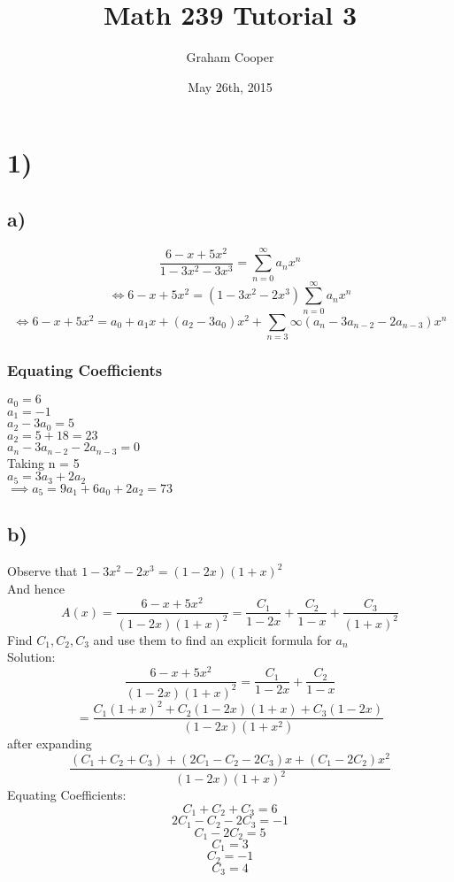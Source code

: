 \documentclass[12pt]{article}
\title{\vspace{-15ex}Math 239 Tutorial 3\vspace{-1ex}}
\date{May 26th, 2015}
\author{Graham Cooper}
\begin{document}
	\maketitle
	
	\section*{1)}
	\subsection*{a)}
	$$\frac{6-x+5x^2}{1-3x^2-3x^3} = \sum_{n=0}^{\infty}a_nx^n$$
	$$\iff 6-x+5x^2 = (1-3x^2-2x^3)\sum_{n=0}^{\infty}a_nx^n$$
	$$\iff 6-x+5x^2 = a_0 + a_1x + (a_2 - 3a_0)x^2 + \sum_{n = 3}{\infty}(a_n - 3a_{n-2} - 2a_{n-3})x^n$$
	
	\subsubsection*{Equating Coefficients}
	$a_0 = 6$\\
	$a_1 = -1$\\
	$a_2 - 3a_0 = 5$\\
	$a_2 = 5 + 18 = 23$\\
	$a_n - 3a_{n-2} - 2a_{n-3} = 0$\\
	
	Taking n = 5\\
	$a_5 = 3a_3 + 2a_2$\\
	$\implies a_5 = 9a_1 + 6a_0 + 2a_2 = 73$\\
	
	\subsection*{b)}
	Observe that $1-3x^2 - 2x^3 = (1-2x)(1+x)^2$\\
	
	And hence\\
	
	$$A(x) = \frac{6-x+5x^2}{(1-2x)(1+x)^2} = \frac{C_1}{1-2x} + \frac{C_2}{1-x} + \frac{C_3}{(1+x)^2}$$
	Find $C_1,C_2, C_3$ and use them to find an explicit formula for $a_n$\\
	
	Solution:\\
	$$\frac{6-x+5x^2}{(1-2x)(1+x)^2} = \frac{C_1}{1-2x} + \frac{C_2}{1-x}$$
	$$= \frac{C_1(1+x)^2 + C_2(1-2x)(1+x) + C_3(1-2x)}{(1-2x)(1+x^2)}$$
	after expanding
	$$\frac{(C_1 + C_2 + C_3) + (2C_1 - C_2 - 2C_3)x + (C_1 -2C_2)x^2}{(1-2x)(1+x)^2}$$
	Equating Coefficients:
	$$C_1 + C_2 + C_3 = 6$$
	$$2C_1 - C_2 - 2C_3 = -1$$
	$$C_1 - 2C_2 = 5$$
	$$C_1 = 3$$
	$$C_2 = -1$$
	$$C_3 = 4$$
	
\end{document}
